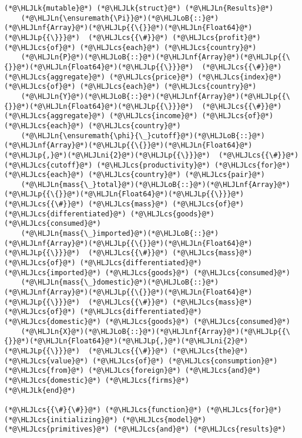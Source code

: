 \documentclass[12pt,a4paper]{article}
\newcommand{\HLJLk}[1]{\textcolor[RGB]{148,91,176}{\textbf{#1}}}
\newcommand{\HLJLn}[1]{#1}
\newcommand{\HLJLnf}[1]{\textcolor[RGB]{66,102,213}{#1}}
\newcommand{\HLJLni}[1]{\textcolor[RGB]{59,151,46}{#1}}
\newcommand{\HLJLoB}[1]{\textcolor[RGB]{102,102,102}{\textbf{#1}}}
\newcommand{\HLJLp}[1]{#1}
\newcommand{\HLJLcs}[1]{\textcolor[RGB]{153,153,119}{\textit{#1}}}
\begin{document}
\begin{lstlisting}
(*@\HLJLk{mutable}@*) (*@\HLJLk{struct}@*) (*@\HLJLn{Results}@*)
    (*@\HLJLn{\ensuremath{\Pi}}@*)(*@\HLJLoB{::}@*)(*@\HLJLnf{Array}@*)(*@\HLJLp{{\{}}@*)(*@\HLJLn{Float64}@*)(*@\HLJLp{{\}}}@*)  (*@\HLJLcs{{\#}}@*) (*@\HLJLcs{profit}@*) (*@\HLJLcs{of}@*) (*@\HLJLcs{each}@*) (*@\HLJLcs{country}@*)
    (*@\HLJLn{P}@*)(*@\HLJLoB{::}@*)(*@\HLJLnf{Array}@*)(*@\HLJLp{{\{}}@*)(*@\HLJLn{Float64}@*)(*@\HLJLp{{\}}}@*)  (*@\HLJLcs{{\#}}@*) (*@\HLJLcs{aggregate}@*) (*@\HLJLcs{price}@*) (*@\HLJLcs{index}@*) (*@\HLJLcs{of}@*) (*@\HLJLcs{each}@*) (*@\HLJLcs{country}@*)
    (*@\HLJLn{Y}@*)(*@\HLJLoB{::}@*)(*@\HLJLnf{Array}@*)(*@\HLJLp{{\{}}@*)(*@\HLJLn{Float64}@*)(*@\HLJLp{{\}}}@*)  (*@\HLJLcs{{\#}}@*) (*@\HLJLcs{aggregate}@*) (*@\HLJLcs{income}@*) (*@\HLJLcs{of}@*) (*@\HLJLcs{each}@*) (*@\HLJLcs{country}@*)
    (*@\HLJLn{\ensuremath{\phi}{\_}cutoff}@*)(*@\HLJLoB{::}@*)(*@\HLJLnf{Array}@*)(*@\HLJLp{{\{}}@*)(*@\HLJLn{Float64}@*)(*@\HLJLp{,}@*)(*@\HLJLni{2}@*)(*@\HLJLp{{\}}}@*)  (*@\HLJLcs{{\#}}@*) (*@\HLJLcs{cutoff}@*) (*@\HLJLcs{productivity}@*) (*@\HLJLcs{for}@*) (*@\HLJLcs{each}@*) (*@\HLJLcs{country}@*) (*@\HLJLcs{pair}@*)
    (*@\HLJLn{mass{\_}total}@*)(*@\HLJLoB{::}@*)(*@\HLJLnf{Array}@*)(*@\HLJLp{{\{}}@*)(*@\HLJLn{Float64}@*)(*@\HLJLp{{\}}}@*)  (*@\HLJLcs{{\#}}@*) (*@\HLJLcs{mass}@*) (*@\HLJLcs{of}@*) (*@\HLJLcs{differentiated}@*) (*@\HLJLcs{goods}@*) (*@\HLJLcs{consumed}@*)
    (*@\HLJLn{mass{\_}imported}@*)(*@\HLJLoB{::}@*)(*@\HLJLnf{Array}@*)(*@\HLJLp{{\{}}@*)(*@\HLJLn{Float64}@*)(*@\HLJLp{{\}}}@*)  (*@\HLJLcs{{\#}}@*) (*@\HLJLcs{mass}@*) (*@\HLJLcs{of}@*) (*@\HLJLcs{differentiated}@*) (*@\HLJLcs{imported}@*) (*@\HLJLcs{goods}@*) (*@\HLJLcs{consumed}@*)
    (*@\HLJLn{mass{\_}domestic}@*)(*@\HLJLoB{::}@*)(*@\HLJLnf{Array}@*)(*@\HLJLp{{\{}}@*)(*@\HLJLn{Float64}@*)(*@\HLJLp{{\}}}@*)  (*@\HLJLcs{{\#}}@*) (*@\HLJLcs{mass}@*) (*@\HLJLcs{of}@*) (*@\HLJLcs{differentiated}@*) (*@\HLJLcs{domestic}@*) (*@\HLJLcs{goods}@*) (*@\HLJLcs{consumed}@*)
    (*@\HLJLn{X}@*)(*@\HLJLoB{::}@*)(*@\HLJLnf{Array}@*)(*@\HLJLp{{\{}}@*)(*@\HLJLn{Float64}@*)(*@\HLJLp{,}@*)(*@\HLJLni{2}@*)(*@\HLJLp{{\}}}@*)  (*@\HLJLcs{{\#}}@*) (*@\HLJLcs{the}@*) (*@\HLJLcs{value}@*) (*@\HLJLcs{of}@*) (*@\HLJLcs{consumption}@*) (*@\HLJLcs{from}@*) (*@\HLJLcs{foreign}@*) (*@\HLJLcs{and}@*) (*@\HLJLcs{domestic}@*) (*@\HLJLcs{firms}@*)
(*@\HLJLk{end}@*)

(*@\HLJLcs{{\#}{\#}}@*) (*@\HLJLcs{function}@*) (*@\HLJLcs{for}@*) (*@\HLJLcs{initializing}@*) (*@\HLJLcs{model}@*) (*@\HLJLcs{primitives}@*) (*@\HLJLcs{and}@*) (*@\HLJLcs{results}@*)


\end{lstlisting}
\end{document}
